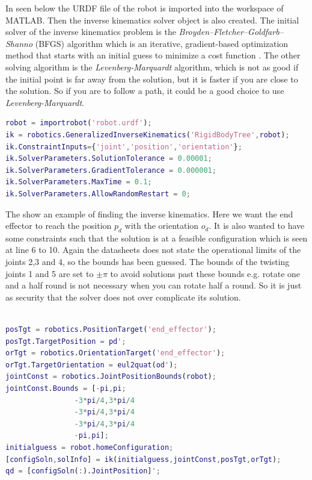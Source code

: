 In  seen below the URDF file of the robot is imported into the workspace of MATLAB. Then the inverse kinematics solver object is also created. The initial solver of the inverse kinematics problem is the \textit{Broyden–Fletcher–Goldfarb–Shanno} (BFGS) algorithm which is an iterative, gradient-based optimization method that starts with an initial guess to minimize a cost function \cite{MatlabRobTool}. The other solving algorithm is the \textit{Levenberg-Marquardt} algorithm, which is not as good if the initial point is far away from the solution, but it is faster if you are close to the solution. So if you are to follow a path, it could be a good choice to use \textit{Levenberg-Marquardt}\cite{MatlabRobTool}. 
\begin{lstlisting}[caption={MATLAB code of creating and specifying an inverse kinematics object},label={lst:robotinit},language=Matlab]
robot = importrobot('robot.urdf');
ik = robotics.GeneralizedInverseKinematics('RigidBodyTree',robot);
ik.ConstraintInputs={'joint','position','orientation'};
ik.SolverParameters.SolutionTolerance = 0.00001;
ik.SolverParameters.GradientTolerance = 0.000001;
ik.SolverParameters.MaxTime = 0.1;
ik.SolverParameters.AllowRandomRestart = 0;
\end{lstlisting}
The  show an example of finding the inverse kinematics. Here we want the end effector to reach the position $p_d$ with the orientation $o_d$. It is also wanted to have some constraints such that the solution is at a feasible configuration which is seen at line 6 to 10. Again the datasheets does not state the operational limits of the joints 2,3 and 4, so the bounds has been guessed. The bounds of the twisting joints 1 and 5 are set to $\pm \pi$ to avoid solutions past these bounds e.g. rotate one and a half round is not necessary when you can rotate half a round. So it is just as security that the solver does not over complicate its solution. \\\\
\begin{lstlisting}[caption={MATLAB code for specifying $p_d$, $o_d$ and joint bounds which is used to find a solution of the inverse kinematics problem},label={lst:gik},language=Matlab]
posTgt = robotics.PositionTarget('end_effector');
posTgt.TargetPosition = pd';
orTgt = robotics.OrientationTarget('end_effector');
orTgt.TargetOrientation = eul2quat(od');
jointConst = robotics.JointPositionBounds(robot);
jointConst.Bounds = [-pi,pi;
                -3*pi/4,3*pi/4
                -3*pi/4,3*pi/4
                -3*pi/4,3*pi/4
                -pi,pi];
initialguess = robot.homeConfiguration;
[configSoln,solInfo] = ik(initialguess,jointConst,posTgt,orTgt);
qd = [configSoln(:).JointPosition]';
\end{lstlisting}
